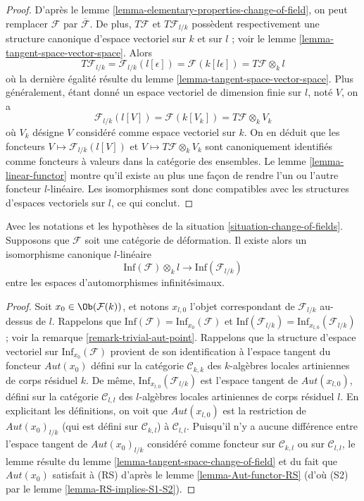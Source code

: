 \begin{proof}
D'après le lemme \ref{lemma-elementary-properties-change-of-field}, on peut
remplacer $\mathcal{F}$ par $\overline{\mathcal{F}}$. De plus,
$T\mathcal{F}$ et $T\mathcal{F}_{l/k}$ possèdent respectivement une structure
canonique d'espace vectoriel sur $k$ et sur $l$ ; voir le lemme
\ref{lemma-tangent-space-vector-space}. Alors
$$
T\mathcal{F}_{l/k} = \mathcal{F}_{l/k}(l[\epsilon])
= \mathcal{F}(k[l\epsilon]) = T\mathcal{F} \otimes_k l
$$
où la dernière égalité résulte du lemme
\ref{lemma-tangent-space-vector-space}. Plus généralement, étant donné un
espace vectoriel de dimension finie sur $l$, noté $V$, on a
$$
\mathcal{F}_{l/k}(l[V]) = \mathcal{F}(k[V_k]) = T\mathcal{F} \otimes_k V_k
$$
où $V_k$ désigne $V$ considéré comme espace vectoriel sur $k$. On en déduit
que les foncteurs $V \mapsto \mathcal{F}_{l/k}(l[V])$ et
$V \mapsto T\mathcal{F} \otimes_k V_k$ sont canoniquement identifiés comme
foncteurs à valeurs dans la catégorie des ensembles. Le lemme
\ref{lemma-linear-functor} montre qu'il existe au plus une façon de rendre l'un
ou l'autre foncteur $l$-linéaire. Les isomorphismes sont donc compatibles avec les
structures d'espaces vectoriels sur $l$, ce qui conclut.
\end{proof}

\begin{lemma}
\label{lemma-inf-aut-change-of-field}
Avec les notations et les hypothèses de la situation
\ref{situation-change-of-fields}. Supposons que $\mathcal{F}$ soit une
catégorie de déformation. Il existe alors un isomorphisme canonique
$l$-linéaire
$$
\text{Inf}(\mathcal{F}) \otimes_k l
\longrightarrow
\text{Inf}(\mathcal{F}_{l/k})
$$
entre les espaces d'automorphismes infinitésimaux.
\end{lemma}

\begin{proof}
Soit $x_0 \in \Ob(\mathcal{F}(k))$, et notons $x_{l, 0}$ l'objet correspondant
de $\mathcal{F}_{l/k}$ au-dessus de $l$. Rappelons que
$\text{Inf}(\mathcal{F}) = \text{Inf}_{x_0}(\mathcal{F})$ et
$\text{Inf}(\mathcal{F}_{l/k}) = \text{Inf}_{x_{l, 0}}(\mathcal{F}_{l/k})$ ;
voir la remarque \ref{remark-trivial-aut-point}. Rappelons que la structure
d'espace vectoriel sur $\text{Inf}_{x_0}(\mathcal{F})$ provient de son
identification à l'espace tangent du foncteur $\mathit{Aut}(x_0)$ défini sur la
catégorie $\mathcal{C}_{k, k}$ des $k$-algèbres locales artiniennes de corps
résiduel $k$. De même, $\text{Inf}_{x_{l, 0}}(\mathcal{F}_{l/k})$ est l'espace
tangent de $\mathit{Aut}(x_{l, 0})$, défini sur la catégorie
$\mathcal{C}_{l, l}$ des $l$-algèbres locales artiniennes de corps résiduel
$l$. En explicitant les définitions, on voit que $\mathit{Aut}(x_{l, 0})$ est
la restriction de $\mathit{Aut}(x_0)_{l/k}$ (qui est défini sur
$\mathcal{C}_{k, l}$) à $\mathcal{C}_{l, l}$. Puisqu'il n'y a aucune
différence entre l'espace tangent de $\mathit{Aut}(x_0)_{l/k}$ considéré comme
foncteur sur $\mathcal{C}_{k, l}$ ou sur $\mathcal{C}_{l, l}$, le lemme résulte
du lemme \ref{lemma-tangent-space-change-of-field} et du fait que
$\mathit{Aut}(x_0)$ satisfait à (RS) d'après le lemme
\ref{lemma-Aut-functor-RS} (d'où (S2) par le lemme
\ref{lemma-RS-implies-S1-S2}).
\end{proof}

